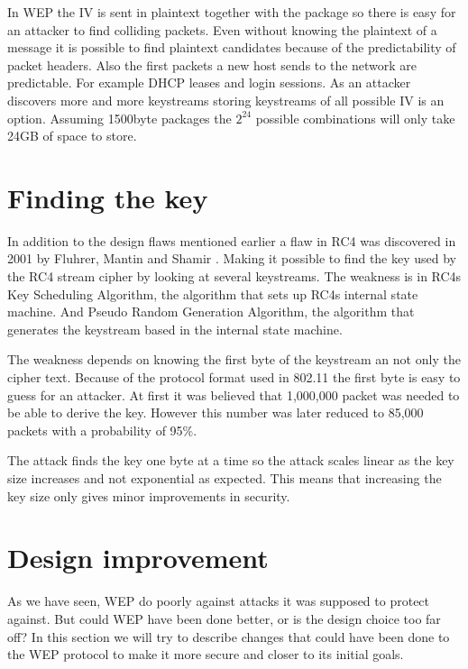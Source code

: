 \documentclass[twocolumn,11pt]{IEEEtran}
\begin{document}
In WEP the IV is sent in plaintext together with the package so there is easy for an attacker to find colliding packets. Even without knowing the plaintext of a message it is possible to find plaintext candidates because of the predictability of packet headers. Also the first packets a new host sends to the network are predictable. For example DHCP leases and login sessions. As an attacker discovers more and more keystreams storing keystreams of all possible IV is an option. Assuming 1500byte packages the $2^24$ possible combinations will only take 24GB of space to store.

\section {Finding the key}
\label{sec:find_key}
In addition to the design flaws mentioned earlier a flaw in RC4 was discovered in 2001 by Fluhrer, Mantin and Shamir \cite{Fluhrer:New}. Making it possible to find the key used by the RC4 stream cipher by looking at several keystreams. The weakness is in RC4s Key Scheduling Algorithm, the algorithm that sets up RC4s internal state machine. And Pseudo Random Generation Algorithm, the algorithm that generates the keystream based in the internal state machine.

The weakness depends on knowing the first byte of the keystream an not only the cipher text. Because of the protocol format used in 802.11 the first byte is easy to guess for an attacker. At first it was believed that 1,000,000 packet \cite{Fluhrer:New} was needed to be able to derive the key. However this number was later reduced to 85,000 packets with a probability of 95\%\cite{Tews:New}.

The attack finds the key one byte at a time so the attack scales linear as the key size increases and not exponential as expected. This means that increasing the key size only gives minor improvements in security.

\section{Design improvement}
\label{sec:improvement}

As we have seen, WEP do poorly against attacks it was supposed to protect against. But could WEP have been done better, or is the design choice too far off? In this section we will try to describe changes that could have been done to the WEP protocol to make it more secure and closer to its initial goals.
\end{document}
